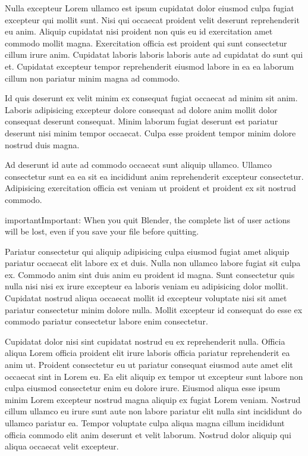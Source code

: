 \documentclass[a4paper,10pt,french]{sphinxmanual}
\begin{document}
Nulla excepteur Lorem ullamco est ipsum cupidatat dolor eiusmod culpa fugiat excepteur qui mollit sunt. Nisi qui occaecat proident velit deserunt reprehenderit eu anim. Aliquip cupidatat nisi proident non quis eu id exercitation amet commodo mollit magna. Exercitation officia est proident qui sunt consectetur cillum irure anim. Cupidatat laboris laboris laboris aute ad cupidatat do sunt qui et. Cupidatat excepteur tempor reprehenderit eiusmod labore in ea ea laborum cillum non pariatur minim magna ad commodo.

Id quis deserunt ex velit minim ex consequat fugiat occaecat ad minim sit anim. Laboris adipisicing excepteur dolore consequat ad dolore anim mollit dolor consequat deserunt consequat. Minim laborum fugiat deserunt est pariatur deserunt nisi minim tempor occaecat. Culpa esse proident tempor minim dolore nostrud duis magna.

Ad deserunt id aute ad commodo occaecat sunt aliquip ullamco. Ullamco consectetur sunt ea ea sit ea incididunt anim reprehenderit excepteur consectetur. Adipisicing exercitation officia est veniam ut proident et proident ex sit nostrud commodo.

\begin{sphinxadmonition}{important}{Important:}
When you quit Blender, the complete list of user actions will be lost, even if you save your file before quitting.
\end{sphinxadmonition}

Pariatur consectetur qui aliquip adipisicing culpa eiusmod fugiat amet aliquip pariatur occaecat elit labore ex et duis. Nulla non ullamco labore fugiat sit culpa ex. Commodo anim sint duis anim eu proident id magna. Sunt consectetur quis nulla nisi nisi ex irure excepteur ea laboris veniam eu adipisicing dolor mollit. Cupidatat nostrud aliqua occaecat mollit id excepteur voluptate nisi sit amet pariatur consectetur minim dolore nulla. Mollit excepteur id consequat do esse ex commodo pariatur consectetur labore enim consectetur.

Cupidatat dolor nisi sint cupidatat nostrud eu ex reprehenderit nulla. Officia aliqua Lorem officia proident elit irure laboris officia pariatur reprehenderit ea anim ut. Proident consectetur eu ut pariatur consequat eiusmod aute amet elit occaecat sint in Lorem eu. Ea elit aliquip ex tempor ut excepteur sunt labore non culpa eiusmod consectetur enim eu dolore irure. Eiusmod aliqua esse ipsum minim Lorem excepteur nostrud magna aliquip ex fugiat Lorem veniam. Nostrud cillum ullamco eu irure sunt aute non labore pariatur elit nulla sint incididunt do ullamco pariatur ea. Tempor voluptate culpa aliqua magna cillum incididunt officia commodo elit anim deserunt et velit laborum. Nostrud dolor aliquip qui aliqua occaecat velit excepteur.
\end{document}
